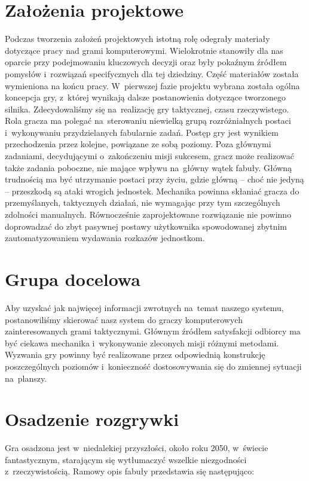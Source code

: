 \documentclass[licencjacka]{pracamgr}
\begin{document}
  \section{Założenia projektowe}
    Podczas tworzenia założeń projektowych istotną rolę odegrały materiały dotyczące pracy nad grami komputerowymi. 
    Wielokrotnie stanowiły dla nas oparcie przy podejmowaniu kluczowych decyzji oraz były pokaźnym źródłem pomysłów
    i~rozwiązań specifycznych dla tej dziedziny. Część materiałów została wymieniona na końcu pracy.
    W~pierwszej fazie projektu wybrana została ogólna koncepcja gry, z~której wynikają dalsze postanowienia dotyczące
    tworzonego silnika. Zdecydowaliśmy się na~realizację gry taktycznej, czasu rzeczywistego. Rola gracza ma polegać
    na~sterowaniu niewielką grupą rozróżnialnych postaci i~wykonywaniu przydzielanych fabularnie zadań. Postęp gry jest 
    wynikiem przechodzenia przez kolejne, powiązane ze sobą poziomy. Poza głównymi zadaniami, decydującymi o~zakończeniu
    misji sukcesem, gracz może realizować także zadania poboczne, nie mające wpływu na~główny wątek fabuły. Główną
    trudnością ma być utrzymanie postaci przy życiu, gdzie główną -- choć nie jedyną -- przeszkodą są ataki wrogich
    jednostek. Mechanika powinna skłaniać gracza do przemyślanych, taktycznych działań, nie wymagając przy tym
    szczególnych zdolności manualnych. Równocześnie zaprojektowane rozwiązanie nie powinno doprowadzać do zbyt pasywnej
    postawy użytkownika spowodowanej zbytnim zautomatyzowaniem wydawania rozkazów jednostkom.

  \section{Grupa docelowa}
    Aby uzyskać jak najwięcej informacji zwrotnych na~temat naszego systemu, postanowiliśmy skierować nasz system do
    graczy komputerowych zainteresowanych grami taktycznymi. Głównym źródłem satysfakcji odbiorcy ma być ciekawa mechanika
    i~wykonywanie zleconych misji różnymi metodami. Wyzwania gry powinny być realizowane przez odpowiednią konstrukcję
    poszczególnych poziomów i~konieczność dostosowywania się do zmiennej sytuacji na~planszy.

  \section{Osadzenie rozgrywki}
    Gra osadzona jest w~niedalekiej przyszłości, około roku 2050, w~świecie fantastycznym, starającym się wytłumaczyć
    wszelkie niezgodności z~rzeczywistością. Ramowy opis fabuły przedstawia się następująco:
\end{document}
